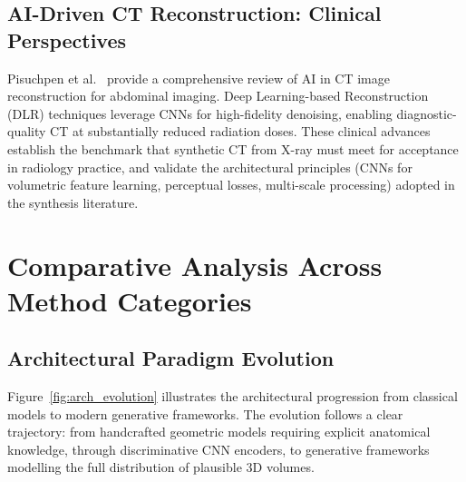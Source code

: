 \documentclass[10pt,twocolumn,a4paper]{article}
\begin{document}
\subsection{AI-Driven CT Reconstruction: Clinical Perspectives}
\label{sec:cnn:clinical}

Pisuchpen et al.~\cite{pisuchpen2026} provide a comprehensive review of AI in
CT image reconstruction for abdominal imaging. Deep Learning-based Reconstruction
(DLR) techniques leverage CNNs for high-fidelity denoising, enabling
diagnostic-quality CT at substantially reduced radiation doses. These clinical
advances establish the benchmark that synthetic CT from X-ray must meet for
acceptance in radiology practice, and validate the architectural principles
(CNNs for volumetric feature learning, perceptual losses, multi-scale
processing) adopted in the synthesis literature.

\section{Comparative Analysis Across Method Categories}
\label{sec:comparison}

\subsection{Architectural Paradigm Evolution}
\label{sec:comparison:arch}

Figure~\ref{fig:arch_evolution} illustrates the architectural progression from
classical models to modern generative frameworks. The evolution follows a clear
trajectory: from handcrafted geometric models requiring explicit anatomical
knowledge, through discriminative CNN encoders, to generative frameworks
modelling the full distribution of plausible 3D volumes.
\end{document}
